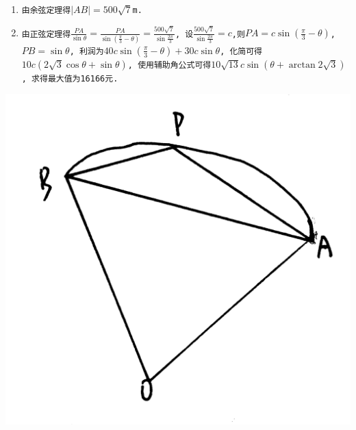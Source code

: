 \documentclass{article}
\newcommand{\1}{\underline{\makebox[1cm]{}}}
\newcommand{\2}{\underline{\makebox[2cm]{}}}
\newcommand{\3}{\underline{\makebox[3cm]{}}}
\newcommand{\4}{\underline{\makebox[4cm]{}}}
\newcommand{\lge}{\large \texttt}
\newlength{\la}
\begin{document}
\begin{minipage}[b]{0.72\linewidth}
    \begin{enumerate}[(1)]
        \item \lge{由余弦定理得$|AB| = 500\sqrt{7}$m.}
        \item \lge{由正弦定理得$\frac{PA}{\sin\theta} = \frac{PA}{\sin(\frac{\pi}{3}-\theta)} = \frac{500\sqrt{7}}{\sin\frac{2\pi}{3}}$, 设$\frac{500\sqrt{7}}{\sin\frac{2\pi}{3}} = c$,则$PA = c \sin(\frac{\pi}{3}-\theta)$, $PB = \sin\theta$, 利润为$40c\sin(\frac{\pi}{3}-\theta) + 30c\sin\theta$, 化简可得$10c(2\sqrt{3}\cos\theta + \sin\theta)$, 使用辅助角公式可得$10\sqrt{13}c\sin(\theta + \arctan 2\sqrt{3})$, 求得最大值为16166元.}
    \end{enumerate}
    \end{minipage}
    \hfill
    \begin{minipage}[b]{0.18\linewidth}
    \includegraphics[height=5.5\baselineskip]{1.png}
\end{minipage}
\end{document}
